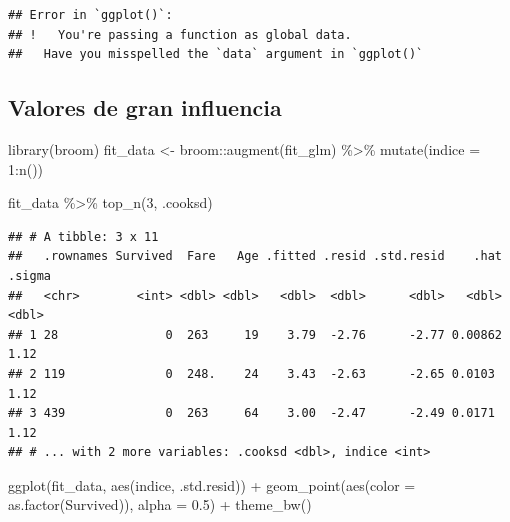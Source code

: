 \documentclass[
  12pt,
]{book}
\newenvironment{Shaded}{\begin{snugshade}}{\end{snugshade}}
\newcommand{\AttributeTok}[1]{\textcolor[rgb]{0.77,0.63,0.00}{#1}}
\newcommand{\DecValTok}[1]{\textcolor[rgb]{0.00,0.00,0.81}{#1}}
\newcommand{\FloatTok}[1]{\textcolor[rgb]{0.00,0.00,0.81}{#1}}
\newcommand{\FunctionTok}[1]{\textcolor[rgb]{0.00,0.00,0.00}{#1}}
\newcommand{\NormalTok}[1]{#1}
\newcommand{\OtherTok}[1]{\textcolor[rgb]{0.56,0.35,0.01}{#1}}
\newcommand{\SpecialCharTok}[1]{\textcolor[rgb]{0.00,0.00,0.00}{#1}}
\begin{document}
\begin{verbatim}
## Error in `ggplot()`:
## !   You're passing a function as global data.
##   Have you misspelled the `data` argument in `ggplot()`
\end{verbatim}

\hypertarget{valores-de-gran-influencia}{%
\subsection{Valores de gran
influencia}\label{valores-de-gran-influencia}}

\begin{Shaded}
\begin{Highlighting}[]
\FunctionTok{library}\NormalTok{(broom)}
\NormalTok{fit\_data }\OtherTok{\textless{}{-}}\NormalTok{ broom}\SpecialCharTok{::}\FunctionTok{augment}\NormalTok{(fit\_glm) }\SpecialCharTok{\%\textgreater{}\%}
    \FunctionTok{mutate}\NormalTok{(}\AttributeTok{indice =} \DecValTok{1}\SpecialCharTok{:}\FunctionTok{n}\NormalTok{())}

\NormalTok{fit\_data }\SpecialCharTok{\%\textgreater{}\%}
    \FunctionTok{top\_n}\NormalTok{(}\DecValTok{3}\NormalTok{, .cooksd)}
\end{Highlighting}
\end{Shaded}

\begin{verbatim}
## # A tibble: 3 x 11
##   .rownames Survived  Fare   Age .fitted .resid .std.resid    .hat .sigma
##   <chr>        <int> <dbl> <dbl>   <dbl>  <dbl>      <dbl>   <dbl>  <dbl>
## 1 28               0  263     19    3.79  -2.76      -2.77 0.00862   1.12
## 2 119              0  248.    24    3.43  -2.63      -2.65 0.0103    1.12
## 3 439              0  263     64    3.00  -2.47      -2.49 0.0171    1.12
## # ... with 2 more variables: .cooksd <dbl>, indice <int>
\end{verbatim}

\begin{Shaded}
\begin{Highlighting}[]
\FunctionTok{ggplot}\NormalTok{(fit\_data, }\FunctionTok{aes}\NormalTok{(indice, .std.resid)) }\SpecialCharTok{+} \FunctionTok{geom\_point}\NormalTok{(}\FunctionTok{aes}\NormalTok{(}\AttributeTok{color =} \FunctionTok{as.factor}\NormalTok{(Survived)),}
    \AttributeTok{alpha =} \FloatTok{0.5}\NormalTok{) }\SpecialCharTok{+} \FunctionTok{theme\_bw}\NormalTok{()}
\end{Highlighting}
\end{Shaded}
\end{document}
